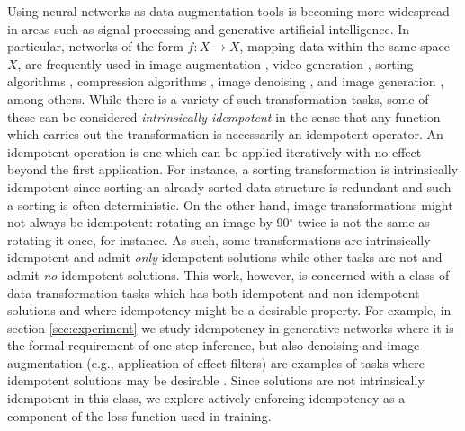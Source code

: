\documentclass{article}
\begin{document}
Using neural networks as data augmentation tools is becoming more widespread in areas such as signal processing and generative artificial intelligence. In particular, networks of the form ${f: X \to X}$, mapping data within the same space $X$, are frequently used in image augmentation \cite{lu-image-aug}, video generation \cite{ma-compression, liu-gans}, sorting algorithms \cite{tambouratzis-sorting}, compression algorithms \cite{namphol-compression, liu-gans}, image denoising \cite{mao-deblurring, ilesanmi-denoising, liu-gans}, and image generation \cite{liu-gans}, among others. While there is a variety of such transformation tasks, some of these can be considered \textit{intrinsically idempotent} in the sense that any function which carries out the transformation is necessarily an idempotent operator. An idempotent operation is one which can be applied iteratively with no effect beyond the first application. For instance, a sorting transformation is intrinsically idempotent since sorting an already sorted data structure is redundant and such a sorting is often deterministic. On the other hand, image transformations might not always be idempotent: rotating an image by 90$^{\circ}$ twice is not the same as rotating it once, for instance. As such, some transformations are intrinsically idempotent and admit \textit{only} idempotent solutions while other tasks are not and admit \textit{no} idempotent solutions. This work, however, is concerned with a class of data transformation tasks which has both idempotent and non-idempotent solutions and where idempotency might be a desirable property. For example, in section \ref{sec:experiment} we study idempotency in generative networks where it is the formal requirement of one-step inference, but also denoising and image augmentation (e.g., application of effect-filters) are examples of tasks where idempotent solutions may be desirable \cite{mao-deblurring,liu-gans}. Since solutions are not intrinsically idempotent in this class, we explore actively enforcing idempotency as a component of the loss function used in training.
\end{document}

